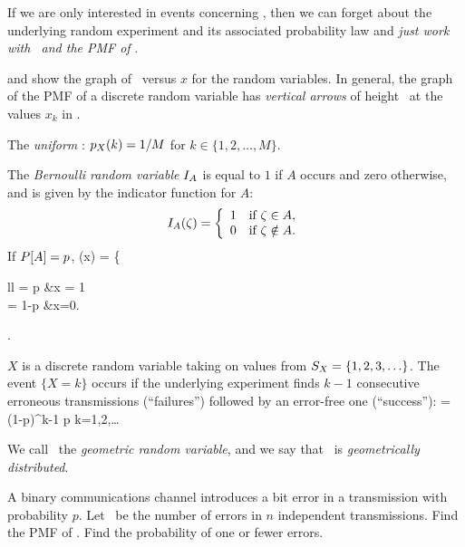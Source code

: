 	\item
	If we are only interested in events concerning \X,
	then we can forget about the underlying random experiment
	and its associated probability law
	and \emph{just work with \ssx\ and the PMF of \X}.

	\item {}

	\item {} and 
	show the graph of \ versus $x$
	for the random variables.
	In general, the graph of the PMF
	of a discrete random variable has \emph{vertical arrows} of height \
	at the values $x_k$ in \ssx.

	\item The \emph{uniform \randvar}: $p_{X}(k) = 1/M$ for $k\in\{1,2,\ldots,M\}$.

	\item
	The \emph{Bernoulli random variable} $I_{A}$ is equal to $1$
	if $A$ occurs and zero otherwise,
	and is given by the indicator function for $A$:
	\[
		I_{A}(\zeta) = \left\{ \begin{array}{ll}
			1	&\mbox{if } \zeta\in A,
			\\0	&\mbox{if } \zeta \notin A.
		\end{array}
		\right.
	\]
	If $P[A]=p$,
		(x) = \left\{ \begin{array}{ll}
			 = p	&\mif x = 1
			\\= 1-p	&\mif x=0.
		\end{array}
		\right.
	\eeql

	\item {}
	$X$ is a discrete random variable taking
	on values from $S_X = \{1, 2, 3, \ldots\}$.
	The event $\{X = k\}$ occurs if the underlying experiment
	finds $k - 1$ consecutive erroneous transmissions
	(``failures'')
	followed by an error-free one (``success''):
		 = (1-p)^{k-1} p
		\mfor k=1,2,\ldots
	\eeql

	We call \X\ the \emph{geometric random variable},
	and we say that \X\ is \emph{geometrically distributed}.

	\item {}
	A binary communications channel introduces
	a bit error in a transmission with probability $p$.
	Let \X\ be the number of errors in $n$ independent transmissions.
	Find the PMF of \X.
	Find the probability of one or fewer errors.

